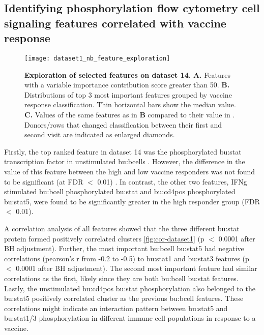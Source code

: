 \subsection{Identifying phosphorylation flow cytometry cell signaling features correlated with vaccine response}

\begin{figure}[htpb]
    \centering
    \texttt{[image: dataset1\_nb\_feature\_exploration]}
    \caption{
        \textbf{Exploration of selected features on dataset 14.}
        \textbf{A.} Features with a variable importance contribution score greater than 50.
        \textbf{B.} Distributions of top 3 most important features grouped by vaccine response classification.
        Thin horizontal bars show the median value.
        \textbf{C.} Values of the same features as in \textbf{B} compared to their value in \secondvis.
        Donors/rows that changed classification between their first and second visit are indicated as enlarged diamonds.
    }\label{fig:dataset1-nb-feature-exploration}
\end{figure}

Firstly, the top ranked feature in dataset 14 was the phosphorylated \gls{bu:stat} transcription factor in unstimulated \gls{bu:bcell}s .
However, the difference in the value of this feature between the high and low vaccine responders was not found to be significant (at FDR $<$ 0.01) .
In contrast, the other two features, IFNg stimulated \gls{bu:bcell} phosphorylated \gls{bu:stat} and \gls{bu:cd4pos} phosphorylated \gls{bu:stat}5, were found to be significantly greater in the high responder group (FDR $<$ 0.01).

A correlation analysis of all features showed that the three different \gls{bu:stat} protein formed positively correlated clusters \autoref{fig:cor-dataset1} (p \(<\) 0.0001 after BH adjustment).
Further, the most important \gls{bu:bcell} \gls{bu:stat}5 had negative correlations (pearson's r from -0.2 to -0.5) to \gls{bu:stat}1 and \gls{bu:stat}3 features (p \(<\) 0.0001 after BH adjustment).
The second most important feature had similar correlations as the first, likely since they are both \gls{bu:bcell} \gls{bu:stat} features.
Lastly, the unstimulated \gls{bu:cd4pos} \gls{bu:stat} phosphorylation also belonged to the \gls{bu:stat}5 positively correlated cluster as the previous \gls{bu:bcell} features.
These correlations might indicate an interaction pattern between \gls{bu:stat}5 and \gls{bu:stat}1/3 phosphorylation in different immune cell populations in response to a vaccine.

